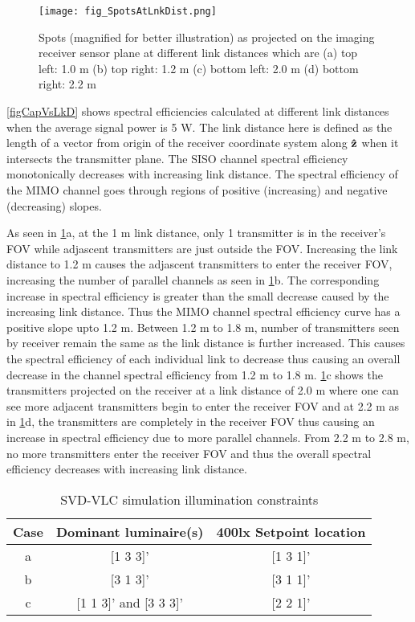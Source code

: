 \begin{figure}[!t]
	\centering
		\texttt{[image: fig\_SpotsAtLnkDist.png]}
	\caption[Spots on sensor at different link distances]{Spots (magnified for better illustration) as projected on the imaging receiver sensor plane at different link distances which are (a) top left: 1.0 m (b) top right: 1.2 m (c) bottom left: 2.0 m (d) bottom right: 2.2 m}
	\label{figSpotsVsLink}
\end{figure}

\figurename{ \ref{figCapVsLkD}} shows spectral efficiencies calculated at different link distances when the average signal power is 5 W. The link distance here is defined as the length of a vector from origin of the receiver coordinate system along {$\bf{\hat{z}}$} when it intersects the transmitter plane. The SISO channel spectral efficiency monotonically decreases with increasing link distance. The spectral efficiency of the MIMO channel goes through regions of positive (increasing) and negative (decreasing) slopes. 

As seen in \figurename{ \ref{figSpotsVsLink}}a, at the 1 m link distance, only 1 transmitter is in the receiver's FOV while adjascent transmitters are just outside the FOV. Increasing the link distance to 1.2 m causes the adjascent transmitters to enter the receiver FOV, increasing the number of parallel channels as seen in \figurename{ \ref{figSpotsVsLink}}b. The corresponding increase in spectral efficiency is greater than the small decrease caused by the increasing link distance. Thus the MIMO channel spectral efficiency curve has a positive slope upto 1.2 m. Between 1.2 m  to 1.8 m, number of transmitters seen by receiver remain the same as the link distance is further increased. This causes the spectral efficiency of each individual link to decrease thus causing an overall decrease in the channel spectral efficiency from 1.2 m to 1.8 m. \figurename{ \ref{figSpotsVsLink}}c shows the transmitters projected on the receiver at a link distance of 2.0 m where one can see more adjacent transmitters begin to enter the receiver FOV and at 2.2 m as in \figurename{ \ref{figSpotsVsLink}}d, the transmitters are completely in the receiver FOV thus causing an increase in spectral efficiency due to more parallel channels. From 2.2 m to 2.8 m, no more transmitters enter the receiver FOV and thus the overall spectral efficiency decreases with increasing link distance. 

\begin{table}[!t] %
\caption{SVD-VLC simulation illumination constraints}
\label{tblSimulation}
\centering
	\begin{tabular}{|c|c|c|}
		\hline
		{\bf{Case}} & \bf{Dominant luminaire(s)} & \bf{400lx Setpoint location}\\
		\hline
		a & [1 3 3]' & [1 3 1]'\\
		\hline
		b & [3 1 3]' & [3 1 1]'\\
		\hline
		c & [1 1 3]' and [3 3 3]' & [2 2 1]'\\
		\hline
	\end{tabular}
\end{table}

